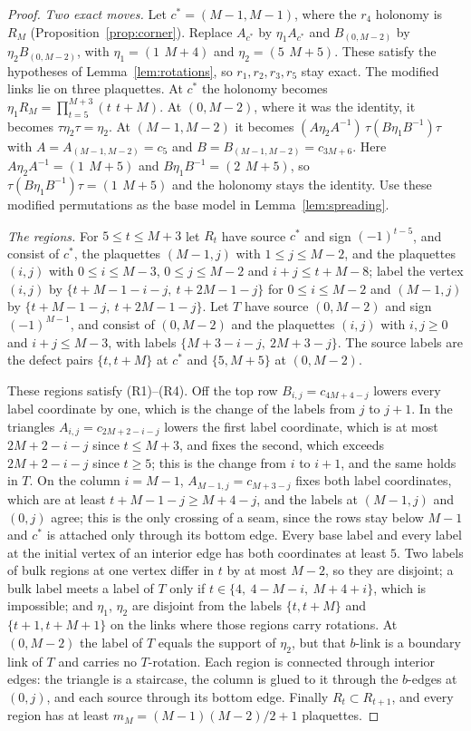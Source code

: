 \documentclass[11pt,a4paper]{article}
\theoremstyle{plain}
\theoremstyle{definition}
\theoremstyle{remark}
\begin{document}
\begin{proof}
\emph{Two exact moves.} Let $c^*=(M-1,M-1)$, where the $r_4$ holonomy is $R_M$ (Proposition~\ref{prop:corner}). Replace $A_{c^*}$ by
$\eta_1A_{c^*}$ and $B_{(0,M-2)}$ by $\eta_2B_{(0,M-2)}$, with $\eta_1=(1\ \,M{+}4)$ and $\eta_2=(5\ \,M{+}5)$. These satisfy the
hypotheses of Lemma~\ref{lem:rotations}, so $r_1,r_2,r_3,r_5$ stay exact. The modified links lie on three plaquettes. At $c^*$ the
holonomy becomes $\eta_1R_M=\prod_{t=5}^{M+3}(t\ \,t{+}M)$. At $(0,M-2)$, where it was the identity, it becomes
$\tau\eta_2\tau=\eta_2$. At $(M-1,M-2)$ it becomes $(A\eta_2A^{-1})\,\tau(B\eta_1B^{-1})\tau$ with $A=A_{(M-1,M-2)}=c_5$ and
$B=B_{(M-1,M-2)}=c_{3M+6}$. Here $A\eta_2A^{-1}=(1\ \,M{+}5)$ and $B\eta_1B^{-1}=(2\ \,M{+}5)$, so $\tau(B\eta_1B^{-1})\tau=(1\ \,M{+}5)$ and
the holonomy stays the identity. Use these modified permutations as the base model in Lemma~\ref{lem:spreading}.

\emph{The regions.} For $5\le t\le M+3$ let $R_t$ have source $c^*$ and sign $(-1)^{t-5}$, and consist of $c^*$, the plaquettes $(M-1,j)$
with $1\le j\le M-2$, and the plaquettes $(i,j)$ with $0\le i\le M-3$, $0\le j\le M-2$ and $i+j\le t+M-8$; label the vertex $(i,j)$ by
$\{t+M-1-i-j,\ t+2M-1-j\}$ for $0\le i\le M-2$ and $(M-1,j)$ by $\{t+M-1-j,\ t+2M-1-j\}$. Let $T$ have source $(0,M-2)$ and sign
$(-1)^{M-1}$, and consist of $(0,M-2)$ and the plaquettes $(i,j)$ with $i,j\ge0$ and $i+j\le M-3$, with labels $\{M+3-i-j,\ 2M+3-j\}$.
The source labels are the defect pairs $\{t,t+M\}$ at $c^*$ and $\{5,M+5\}$ at $(0,M-2)$.

These regions satisfy (R1)--(R4). Off the top row $B_{i,j}=c_{4M+4-j}$ lowers every label coordinate by one, which is the change of the
labels from $j$ to $j+1$. In the triangles $A_{i,j}=c_{2M+2-i-j}$ lowers the first label coordinate, which is at most $2M+2-i-j$ since
$t\le M+3$, and fixes the second, which exceeds $2M+2-i-j$ since $t\ge5$; this is the change from $i$ to $i+1$, and the same holds in $T$.
On the column $i=M-1$, $A_{M-1,j}=c_{M+3-j}$ fixes both label coordinates, which are at least $t+M-1-j\ge M+4-j$, and the labels at
$(M-1,j)$ and $(0,j)$ agree; this is the only crossing of a seam, since the rows stay below $M-1$ and $c^*$ is attached only through its
bottom edge. Every base label and every label at the initial vertex of an interior edge has both coordinates at least $5$. Two labels of
bulk regions at one vertex differ in $t$ by at most $M-2$, so they are disjoint; a bulk label meets a label of $T$ only if
$t\in\{4,\ 4-M-i,\ M+4+i\}$, which is impossible; and $\eta_1$, $\eta_2$ are disjoint from the labels $\{t,t+M\}$ and $\{t+1,t+M+1\}$
on the links where those regions carry rotations. At $(0,M-2)$ the label of $T$ equals the support of $\eta_2$, but that $b$-link is a boundary link of $T$ and carries no $T$-rotation.
Each region is connected through interior edges: the triangle is a staircase, the column is glued to it through
the $b$-edges at $(0,j)$, and each source through its bottom edge. Finally $R_t\subset R_{t+1}$, and every region has at least
$m_M=(M-1)(M-2)/2+1$ plaquettes.


\end{proof}
\end{document}
